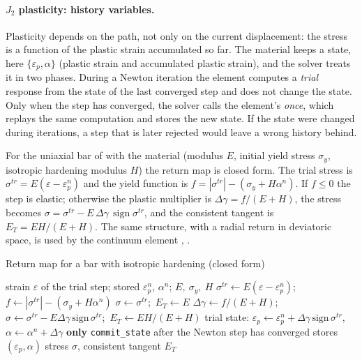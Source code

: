 \paragraph{$J_2$ plasticity: history variables.}
Plasticity depends on the path, not only on the current displacement: the stress is a function of the plastic strain accumulated so far. The material keeps a state, here $\{\varepsilon_p,\alpha\}$ (plastic strain and accumulated plastic strain), and the solver treats it in two phases. During a Newton iteration the element computes a \emph{trial} response from the state of the last converged step and does not change the state. Only when the step has converged, the solver calls the element's  \emph{once}, which replays the same computation and stores the new state. If the state were changed during iterations, a step that is later rejected would leave a wrong history behind.

For the uniaxial bar of  with the material  (modulus $E$, initial yield stress $\sigma_y$, isotropic hardening modulus $H$) the return map is closed form. The trial stress is $\sigma^{tr}=E(\varepsilon-\varepsilon_p^n)$ and the yield function is $f=|\sigma^{tr}|-(\sigma_y+H\alpha^n)$. If $f\le0$ the step is elastic; otherwise the plastic multiplier is $\Delta\gamma=f/(E+H)$, the stress becomes $\sigma=\sigma^{tr}-E\,\Delta\gamma\,\operatorname{sign}\sigma^{tr}$, and the consistent tangent is $E_T=EH/(E+H)$. The same structure, with a radial return in deviatoric space, is used by the continuum element , \citep{simo1985tangent,simo1998inelasticity}.

\begin{algbox}{Return map for a bar with isotropic hardening (closed form)}
\begin{pseudo}
\Require strain $\varepsilon$ of the trial step; stored $\varepsilon_p^n$, $\alpha^n$; $E,\ \sigma_y,\ H$
\State $\sigma^{tr}\gets E(\varepsilon-\varepsilon_p^n)$;\ $f\gets|\sigma^{tr}|-(\sigma_y+H\alpha^n)$
  \State $\sigma\gets\sigma^{tr}$;\ $E_T\gets E$ 
\Else
  \State $\Delta\gamma\gets f/(E+H)$;\ $\sigma\gets\sigma^{tr}-E\Delta\gamma\,\mathrm{sign}\,\sigma^{tr}$;\ $E_T\gets EH/(E+H)$
  \State trial state: $\varepsilon_p\gets\varepsilon_p^n+\Delta\gamma\,\mathrm{sign}\,\sigma^{tr}$,\ $\alpha\gets\alpha^n+\Delta\gamma$
\EndIf
\State \textbf{only} \texttt{commit\_state} after the Newton step has converged stores $(\varepsilon_p,\alpha)$
\Ensure stress $\sigma$, consistent tangent $E_T$
\end{pseudo}
\end{algbox}

